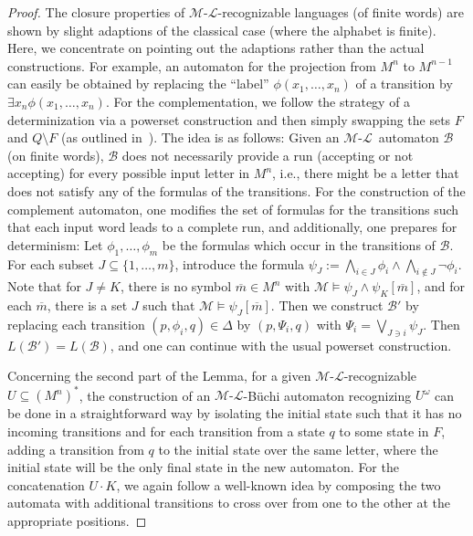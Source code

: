 \documentclass[copyright,creativecommons]{eptcs}
\theoremstyle{plain}
\theoremstyle{nonumberplain}
\newtheorem{proof}{Proof}
\newcommand{\eat}[1]{}
\newcommand{\m}{\ensuremath{\mathcal{M}}}
\newcommand{\el}{\ensuremath{\mathcal{L}}}
\newcommand{\ml}{\ensuremath{\m\textrm{-}\el}}
\begin{document}
\begin{proof}
The closure properties of \ml-recognizable languages (of finite words) are shown by slight 
adaptions of the classical case (where the alphabet is finite). 
Here, we concentrate on pointing out the adaptions rather than the actual constructions. 
For example, an automaton for the projection from $M^n$ to $M^{n-1}$ can easily be 
obtained by replacing the ``label'' 
$\phi(x_1,\ldots,x_n)$ of a transition by $\exists x_n \phi(x_1,\ldots, x_n)$. 
For the complementation, we follow the strategy of a determinization via a powerset construction and then simply swapping the sets $F$ and $Q \setminus F$ (as 
outlined in~\cite{bes08}). The idea is as follows\eat{ (for a full work-out see~\cite{win11})}: 
Given an \ml\ automaton $\mathcal{B}$ (on finite words), $\mathcal{B}$ does not 
necessarily provide a run (accepting or not accepting) for every possible 
input letter in $M^n$, i.e., there might be a letter that does not satisfy 
any of the formulas of the transitions. For the construction of the complement automaton, 
one modifies the set of formulas for the transitions such that each input word
leads to a complete run, and additionally, one prepares for determinism: 
Let $\phi_1,\ldots,\phi_m$ be the formulas which occur in the transitions 
of $\mathcal{B}$. For each subset $J \subseteq \{1,\ldots,m\}$, introduce 
the formula $\psi_J := \bigwedge_{i \in J}{\phi_i} \wedge \bigwedge_{i \notin J}{\neg \phi_i}$. 
Note that for $J \neq K$, there is no symbol $\overline{m} \in M^n$ 
with $\m \models \psi_J \wedge \psi_K [\overline{m}]$, 
 and for each $\overline{m}$, there is a set $J$ such that $\m  \models \psi_J [\overline{m}]$. 
 Then we construct $\mathcal{B}'$ by replacing each transition 
 $(p,\phi_i,q) \in \Delta$ by $(p,\Psi_i,q)$ with $\Psi_i = \bigvee_{J \ni i} \psi_J$. 
Then $L(\mathcal{B}')=L(\mathcal{B})$, and one can continue with the usual 
powerset construction. 

Concerning the second part of the Lemma, 
for a given \ml-recognizable $U \subseteq (M^n)^*$, 
the construction of an \ml-B{\"u}chi automaton recognizing $U^{\omega}$ can be done 
in a straightforward way by isolating the initial state such that it has no incoming 
transitions and for each transition from a state $q$ to some state in $F$, adding a transition from $q$ to the initial state over the same letter, where the initial state will be the only final state in the new automaton. 
For the concatenation $U \cdot K$, we again follow a well-known idea by composing 
the two automata with additional transitions to cross over from one to the other 
at the appropriate positions.
\end{proof}
\end{document}
